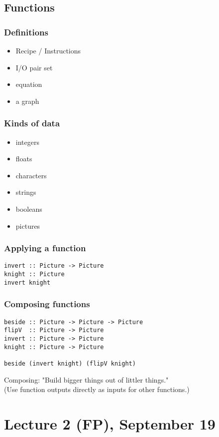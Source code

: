 \documentclass{article}
\begin{document}
\subsection{Functions}
\subsubsection{Definitions}
\begin{itemize}
    \item Recipe / Instructions
    \item I/O pair set
    \item equation
    \item a graph
\end{itemize}
\subsubsection{Kinds of data}
\begin{itemize}
    \item integers
    \item floats
    \item characters
    \item strings
    \item booleans
    \item pictures
\end{itemize}
\subsubsection{Applying a function}
\begin{verbatim}
invert :: Picture -> Picture
knight :: Picture
invert knight
\end{verbatim}
\subsubsection{Composing functions}
\begin{verbatim}
beside :: Picture -> Picture -> Picture
flipV  :: Picture -> Picture
invert :: Picture -> Picture
knight :: Picture -> Picture

beside (invert knight) (flipV knight)
\end{verbatim}
Composing: "Build bigger things out of littler things."\\
(Use function outputs directly as inputs for other functions.)
\section{Lecture 2 (FP), September 19}
\end{document}
